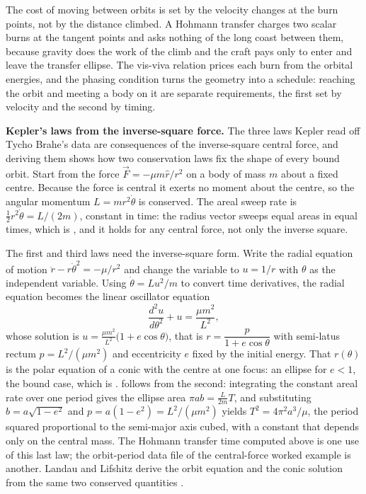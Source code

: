 \begin{principle}
The cost of moving between orbits is set by the velocity changes at the
burn points, not by the distance climbed. A Hohmann transfer charges
two scalar burns at the tangent points and asks nothing of the long
coast between them, because gravity does the work of the climb and the
craft pays only to enter and leave the transfer ellipse. The vis-viva
relation prices each burn from the orbital energies, and the phasing
condition turns the geometry into a schedule: reaching the orbit and
meeting a body on it are separate requirements, the first set by
velocity and the second by timing.
\end{principle}





\begin{mastery}
\textbf{Kepler's laws from the inverse-square force.} The three laws
Kepler read off Tycho Brahe's data are consequences of the
inverse-square central force, and deriving them shows how two
conservation laws fix the shape of every bound orbit. Start from the
force $\vec{F}=-\mu m\hat{r}/r^{2}$ on a body of mass $m$ about a fixed
centre. Because the force is central it exerts no moment about the
centre, so the angular momentum $L=m r^{2}\dot{\theta}$ is conserved.
The areal sweep rate is $\tfrac{1}{2}r^{2}\dot{\theta}=L/(2m)$, constant
in time: the radius vector sweeps equal areas in equal times, which is
, and it holds for any central force, not
only the inverse square.

The first and third laws need the inverse-square form. Write the radial
equation of motion $\ddot{r}-r\dot{\theta}^{2}=-\mu/r^{2}$ and change
the variable to $u=1/r$ with $\theta$ as the independent variable. Using
$\dot{\theta}=Lu^{2}/m$ to convert time derivatives, the radial equation
becomes the linear oscillator equation
\[
\frac{d^{2}u}{d\theta^{2}}+u=\frac{\mu m^{2}}{L^{2}},
\]
whose solution is $u=\frac{\mu m^{2}}{L^{2}}\bigl(1+e\cos\theta\bigr)$,
that is $r=\dfrac{p}{1+e\cos\theta}$ with semi-latus rectum $p=L^{2}/
(\mu m^{2})$ and eccentricity $e$ fixed by the initial energy. That
$r(\theta)$ is the polar equation of a conic with the centre at one
focus: an ellipse for $e<1$, the bound case, which is .  follows from the second:
integrating the constant areal rate over one period gives the ellipse
area $\pi a b=\frac{L}{2m}T$, and substituting $b=a\sqrt{1-e^{2}}$ and
$p=a(1-e^{2})=L^{2}/(\mu m^{2})$ yields $T^{2}=4\pi^{2}a^{3}/\mu$, the
period squared proportional to the semi-major axis cubed, with a
constant that depends only on the central mass. The Hohmann transfer
time computed above is one use of this last law; the orbit-period data
file of the central-force worked example is another. Landau and
Lifshitz derive the orbit equation and the conic solution from the same
two conserved quantities \cite[\S{}15]{text:landau-mechanics}.
\end{mastery}

